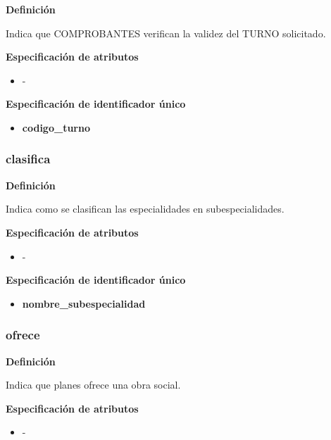 \documentclass[a4paper,11pt]{article}
\begin{document}
\textbf{Definición}

Indica que COMPROBANTES verifican la validez del TURNO solicitado.

\textbf{Especificación de atributos}

\begin{itemize}

    \item -

\end{itemize}

\textbf{Especificación de identificador único}

\begin{itemize}

     \item \textbf{codigo\_turno}

\end{itemize}


\subsubsection{\textbf{clasifica}}

\textbf{Definición}

Indica como se clasifican las especialidades en subespecialidades.

\textbf{Especificación de atributos}

\begin{itemize}

    \item -

\end{itemize}

\textbf{Especificación de identificador único}

\begin{itemize}

     \item \textbf{nombre\_subespecialidad}

\end{itemize}


\subsubsection{\textbf{ofrece}}

\textbf{Definición}

Indica que planes ofrece una obra social.

\textbf{Especificación de atributos}

\begin{itemize}

    \item -

\end{itemize}
\end{document}

